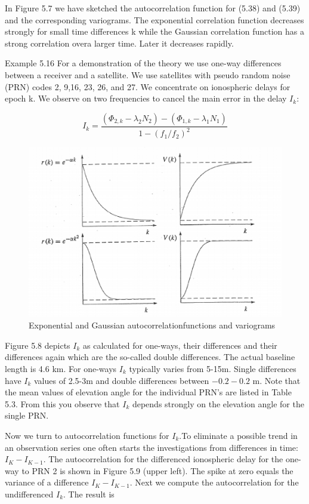  
 In Figure 5.7 we have sketched the autocorrelation function for (5.38) and (5.39) and the corresponding variograms. The exponential correlation function decreases strongly for small time differences k while the Gaussian correlation function has a strong correlation overa larger time. Later it decreases rapidly. 
 
 Example 5.16 For a demonstration of the theory we use one-way differences between a receiver and a satellite. We use satellites with pseudo random noise (PRN) codes 2, 9,16, 23, 26, and 27. We concentrate on ionospheric delays for epoch k. We observe on two frequencies to cancel the main error in the delay $ I_{k} $:
 
 \[ I_{k} =\frac{(\Phi_{2,k}-\lambda_{2}N_{2})-(\Phi_{1,k}-\lambda_{1}N_{1})}{1-(f_{1}/f_{2})^{2}} \]
 
 \begin{figure}[h]
 	\centering
 	\includegraphics[width=0.7\linewidth]{TeX_files/Part02/chapter05/image/6}
 	\caption{Exponential and Gaussian autocorrelationfunctions and variograms}
 	\label{ }
 \end{figure}
 
 
 Figure 5.8 depicts $ I_{k}$ as calculated for one-ways, their differences and their differences again which are the so-called double differences. The actual baseline length is 4.6 km. For one-ways $ I_{k} $ typically varies from 5-15m. Single differences have $ I_{k} $ values of 2.5-3m and double differences between $ -0.2-0.2 $ m. Note that the mean values of elevation angle for the individual PRN’s are listed in Table 5.3. From this you observe that $ I_{k} $ depends strongly on the elevation angle for the single PRN. 
 
 Now we turn to autocorrelation functions for $ I_{k} $.To eliminate a possible trend in an observation series one often starts the investigations from differences in time:$ I_{K}-I_{K-1} $. The autocorrelation for the differenced ionospheric delay for the one-way to PRN 2 is shown in Figure 5.9 (upper left). The spike at zero equals the variance of a difference $ I_{K}-I_{K-1} $. Next we compute the autocorrelation for the undifferenced $ I_{k} $. The result is
 
